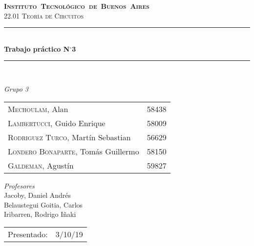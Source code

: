 \begin{titlepage}
\newcommand{\HRule}{\rule{\linewidth}{0.5mm}}
\center
\mbox{\textsc{\LARGE \bfseries {Instituto Tecnológico de Buenos Aires}}}\\[1.5cm]
\textsc{\Large 22.01 Teoría de Circuitos}\\[0.5cm]


\HRule \\[0.6cm]
{ \Huge \bfseries Trabajo práctico N$^{\circ}$3}\\[0.4cm] 
\HRule \\[1.5cm]


{\large

\emph{Grupo 3}\\
\vspace{3px}

\begin{tabular}{lr} 	
\textsc{Mechoulam}, Alan  &  58438\\
\textsc{Lambertucci}, Guido Enrique  & 58009 \\
\textsc{Rodriguez Turco}, Martín Sebastian  & 56629 \\
\textsc{Londero Bonaparte}, Tomás Guillermo  & 58150 \\
\textsc{Galdeman}, Agustín & 59827\\
\end{tabular}

\vspace{20px}

\emph{Profesores}\\
Jacoby, Daniel Andrés\\
Belaustegui Goitia, Carlos\\
Iribarren, Rodrigo Iñaki\\
\vspace{3px}

\vspace{100px}

\begin{tabular}{ll}

Presentado: & 3/10/19\\

\end{tabular}

}

\vfill

\end{titlepage}

